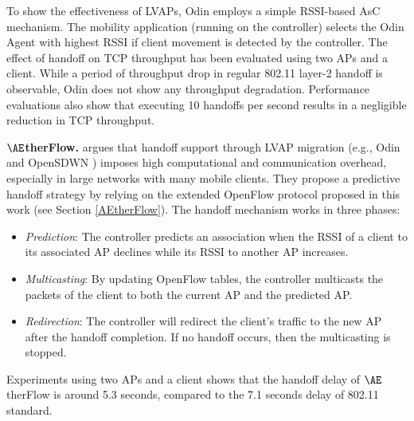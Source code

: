 To show the effectiveness of LVAPs, Odin employs a simple RSSI-based AsC mechanism.
The mobility application (running on the controller) selects the Odin Agent with highest RSSI if client movement is detected by the controller. 
The effect of handoff on TCP throughput has been evaluated using two APs and a client. 
While a period of throughput drop in regular 802.11 layer-2 handoff is observable, Odin does not show any throughput degradation.
Performance evaluations also show that executing 10 handoffs per second results in a negligible reduction in TCP throughput.






\label{AEtherflow_AM}
\textbf{$\AE$therFlow.} \cite{AEtherFlow} argues that handoff support through LVAP migration (e.g., Odin \cite{Odin2} and OpenSDWN \cite{OpenSDWN}) imposes high computational and communication overhead, especially in large networks with many mobile clients.
They propose a predictive handoff strategy by relying on the extended OpenFlow protocol proposed in this work (see Section \ref{AEtherFlow}).
The handoff mechanism works in three phases: 
\begin{itemize}
	\item \textit{Prediction}: %
	The controller predicts an association when the RSSI of a client to its associated AP declines while its RSSI to another AP increases. 
	\item \textit{Multicasting}: By updating OpenFlow tables, the controller multicasts the packets of the client to both the current AP and the predicted AP.
	\item \textit{Redirection}: The controller will redirect the client's traffic to the new AP after the handoff completion. If no handoff occurs, then the multicasting is stopped.
\end{itemize}

Experiments using two APs and a client shows that the handoff delay of $\AE$therFlow is around 5.3 seconds, compared to the 7.1 seconds delay of 802.11 standard.


